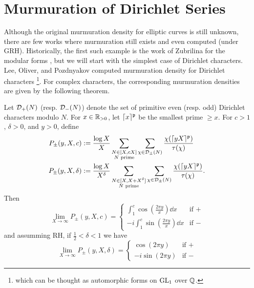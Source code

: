 \section{Murmuration of Dirichlet Series}

Although the original murmuration density for elliptic curves is still unknown, there are few works where murmuration still exists and even computed (under GRH).
Historically, the first such example is the work of Zubrilina for the modular forms \cite{zubrilina2023murmurations}, but we will start with the simplest case of Dirichlet characters.
Lee, Oliver, and Pozdnyakov computed murmuration density for Dirichlet characters \cite{lee2025murmurations}\footnote{which can be thought as  automorphic forms on $\mathrm{GL}_1$ over $\mathbb{Q}$.}.
For complex characters, the corresponding murmuration densities are given by the following theorem.

\begin{theorem}
    \label{thm:lop_dirichlet}
    Let $\mathcal{D}_{+}(N)$ (resp. $\mathcal{D}_{-}(N)$) denote the set of primitive even (resp. odd) Dirichlet characters modulo $N$.
    For $x \in \mathbb{R}_{> 0}$, let $\lceil x \rceil^{\mathfrak{p}}$ be the smallest prime $\ge x$.
    For $c > 1$, $\delta > 0$, and $y > 0$, define
    \begin{align*}
        P_{\pm}(y, X, c) &:= \frac{\log X}{X} \sum_{\substack{N \in [X, cX] \\ N \text{ prime}}} \sum_{\chi \in \mathcal{D}_{\pm}(N)} \frac{\chi(\lceil yX \rceil^{\mathfrak{p}})}{\tau(\chi)} \\
        P_{\pm}(y, X, \delta) &:= \frac{\log X}{X^\delta} \sum_{\substack{N \in [X, X + X^\delta] \\ N \text{ prime}}} \sum_{\chi \in \mathcal{D}_{\pm}(N)} \frac{\chi(\lceil yX \rceil^{\mathfrak{p}})}{\tau(\chi)}.
    \end{align*}
    Then
    \begin{equation}
        \label{eqn:lee_1}
        \lim_{X \to \infty} P_{\pm} (y, X, c) = \begin{cases}
            \int_{1}^{c} \cos\left(\frac{2 \pi y}{x}\right) \dd x & \text{if } + \\
            -i \int_{1}^{c} \sin \left(\frac{2 \pi y}{x}\right) \dd x & \text{if } -
        \end{cases}
    \end{equation}
    and assumming RH, if $\frac{1}{2} < \delta < 1$ we have
    \begin{equation}
        \label{eqn:lee_2}
        \lim_{X \to \infty} P_{\pm} (y, X, \delta) = \begin{cases}
            \cos (2 \pi y) & \text{if } + \\
            -i \sin (2 \pi y) & \text{if } -
        \end{cases}
    \end{equation}
\end{theorem}

